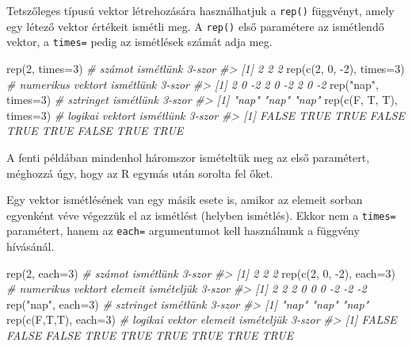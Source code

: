 \documentclass[
]{book}
\newenvironment{Shaded}{\begin{snugshade}}{\end{snugshade}}
\newcommand{\AttributeTok}[1]{\textcolor[rgb]{0.77,0.63,0.00}{#1}}
\newcommand{\CommentTok}[1]{\textcolor[rgb]{0.56,0.35,0.01}{\textit{#1}}}
\newcommand{\DecValTok}[1]{\textcolor[rgb]{0.00,0.00,0.81}{#1}}
\newcommand{\FunctionTok}[1]{\textcolor[rgb]{0.00,0.00,0.00}{#1}}
\newcommand{\NormalTok}[1]{#1}
\newcommand{\SpecialCharTok}[1]{\textcolor[rgb]{0.00,0.00,0.00}{#1}}
\newcommand{\StringTok}[1]{\textcolor[rgb]{0.31,0.60,0.02}{#1}}
\begin{document}
Tetszőleges típusú vektor létrehozására használhatjuk a \texttt{rep()} függvényt, amely egy létező vektor értékeit ismétli meg. A \texttt{rep()} első paramétere az ismétlendő vektor, a \texttt{times=} pedig az ismétlések számát adja meg.

\begin{Shaded}
\begin{Highlighting}[]
\FunctionTok{rep}\NormalTok{(}\DecValTok{2}\NormalTok{, }\AttributeTok{times=}\DecValTok{3}\NormalTok{)            }\CommentTok{\# számot ismétlünk 3{-}szor}
\CommentTok{\#\textgreater{} [1] 2 2 2}
\FunctionTok{rep}\NormalTok{(}\FunctionTok{c}\NormalTok{(}\DecValTok{2}\NormalTok{, }\DecValTok{0}\NormalTok{, }\SpecialCharTok{{-}}\DecValTok{2}\NormalTok{), }\AttributeTok{times=}\DecValTok{3}\NormalTok{)  }\CommentTok{\# numerikus vektort ismétlünk 3{-}szor}
\CommentTok{\#\textgreater{} [1]  2  0 {-}2  2  0 {-}2  2  0 {-}2}
\FunctionTok{rep}\NormalTok{(}\StringTok{"nap"}\NormalTok{, }\AttributeTok{times=}\DecValTok{3}\NormalTok{)        }\CommentTok{\# sztringet ismétlünk 3{-}szor}
\CommentTok{\#\textgreater{} [1] "nap" "nap" "nap"}
\FunctionTok{rep}\NormalTok{(}\FunctionTok{c}\NormalTok{(F, T, T), }\AttributeTok{times=}\DecValTok{3}\NormalTok{)   }\CommentTok{\# logikai vektort ismétlünk 3{-}szor}
\CommentTok{\#\textgreater{} [1] FALSE  TRUE  TRUE FALSE  TRUE  TRUE FALSE  TRUE  TRUE}
\end{Highlighting}
\end{Shaded}

A fenti példában mindenhol háromszor ismételtük meg az első paramétert, méghozzá úgy, hogy az R egymás után sorolta fel őket.

Egy vektor ismétlésének van egy másik esete is, amikor az elemeit sorban egyenként véve végezzük el az ismétlést (helyben ismétlés). Ekkor nem a \texttt{times=} paramétert, hanem az \texttt{each=} argumentumot kell használnunk a függvény hívásánál.

\begin{Shaded}
\begin{Highlighting}[]
\FunctionTok{rep}\NormalTok{(}\DecValTok{2}\NormalTok{, }\AttributeTok{each=}\DecValTok{3}\NormalTok{)            }\CommentTok{\# számot ismétlünk 3{-}szor}
\CommentTok{\#\textgreater{} [1] 2 2 2}
\FunctionTok{rep}\NormalTok{(}\FunctionTok{c}\NormalTok{(}\DecValTok{2}\NormalTok{, }\DecValTok{0}\NormalTok{, }\SpecialCharTok{{-}}\DecValTok{2}\NormalTok{), }\AttributeTok{each=}\DecValTok{3}\NormalTok{)  }\CommentTok{\# numerikus vektort elemeit ismételjük 3{-}szor}
\CommentTok{\#\textgreater{} [1]  2  2  2  0  0  0 {-}2 {-}2 {-}2}
\FunctionTok{rep}\NormalTok{(}\StringTok{"nap"}\NormalTok{, }\AttributeTok{each=}\DecValTok{3}\NormalTok{)        }\CommentTok{\# sztringet ismétlünk 3{-}szor}
\CommentTok{\#\textgreater{} [1] "nap" "nap" "nap"}
\FunctionTok{rep}\NormalTok{(}\FunctionTok{c}\NormalTok{(F,T,T), }\AttributeTok{each=}\DecValTok{3}\NormalTok{)     }\CommentTok{\# logikai vektor elemeit ismételjük 3{-}szor}
\CommentTok{\#\textgreater{} [1] FALSE FALSE FALSE  TRUE  TRUE  TRUE  TRUE  TRUE  TRUE}
\end{Highlighting}
\end{Shaded}
\end{document}
